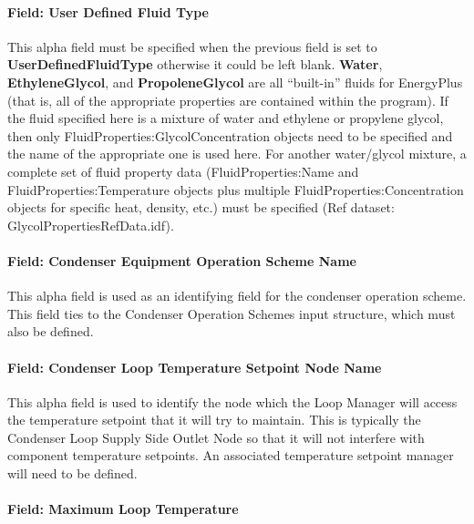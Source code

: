 \paragraph{Field: User Defined Fluid Type}\label{field-user-defined-fluid-type-1}

This alpha field must be specified when the previous field is set to \textbf{UserDefinedFluidType} otherwise it could be left blank. \textbf{Water}, \textbf{EthyleneGlycol}, and \textbf{PropoleneGlycol} are all ``built-in'' fluids for EnergyPlus (that is, all of the appropriate properties are contained within the program). If the fluid specified here is a mixture of water and ethylene or propylene glycol, then only FluidProperties:GlycolConcentration objects need to be specified and the name of the appropriate one is used here. For another water/glycol mixture, a complete set of fluid property data (FluidProperties:Name and FluidProperties:Temperature objects plus multiple FluidProperties:Concentration objects for specific heat, density, etc.) must be specified (Ref dataset: GlycolPropertiesRefData.idf).

\paragraph{Field: Condenser Equipment Operation Scheme Name}\label{field-condenser-equipment-operation-scheme-name}

This alpha field is used as an identifying field for the condenser operation scheme. This field ties to the Condenser Operation Schemes input structure, which must also be defined.

\paragraph{Field: Condenser Loop Temperature Setpoint Node Name}\label{field-condenser-loop-temperature-setpoint-node-name}

This alpha field is used to identify the node which the Loop Manager will access the temperature setpoint that it will try to maintain. This is typically the Condenser Loop Supply Side Outlet Node so that it will not interfere with component temperature setpoints. An associated temperature setpoint manager will need to be defined.

\paragraph{Field: Maximum Loop Temperature}\label{field-maximum-loop-temperature-1}

